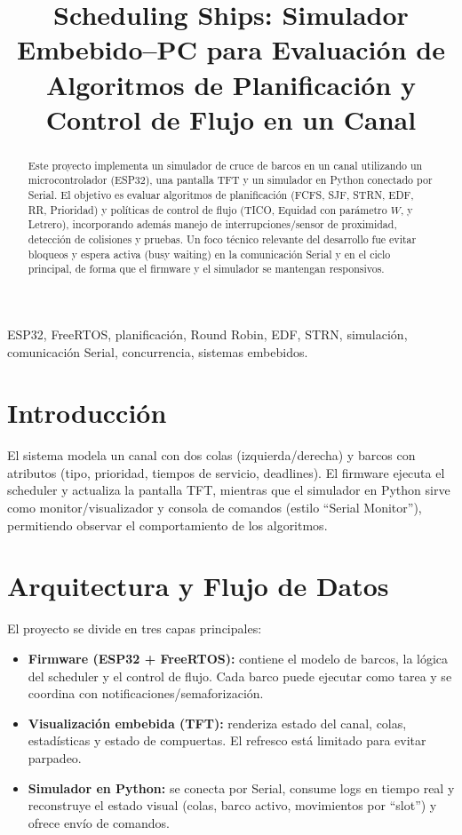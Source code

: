 \documentclass[journal]{IEEEtran}
\title{Scheduling Ships: Simulador Embebido--PC para Evaluación de Algoritmos de Planificación y Control de Flujo en un Canal}
\author{\IEEEauthorblockN{Randall Bolaños López \hspace{0.6em} Christopher Rodriguez Cordero \hspace{0.6em} Mauro Navarro}
}
\begin{document}
\maketitle

\begin{abstract}
Este proyecto implementa un simulador de cruce de barcos en un canal utilizando un microcontrolador (ESP32), una pantalla TFT y un simulador en Python conectado por Serial. El objetivo es evaluar algoritmos de planificación (FCFS, SJF, STRN, EDF, RR, Prioridad) y políticas de control de flujo (TICO, Equidad con parámetro $W$, y Letrero), incorporando además manejo de interrupciones/sensor de proximidad, detección de colisiones y pruebas. Un foco técnico relevante del desarrollo fue evitar bloqueos y espera activa (busy waiting) en la comunicación Serial y en el ciclo principal, de forma que el firmware y el simulador se mantengan responsivos.
\end{abstract}

\begin{IEEEkeywords}
ESP32, FreeRTOS, planificación, Round Robin, EDF, STRN, simulación, comunicación Serial, concurrencia, sistemas embebidos.
\end{IEEEkeywords}

\section{Introducción}
El sistema modela un canal con dos colas (izquierda/derecha) y barcos con atributos (tipo, prioridad, tiempos de servicio, deadlines). El firmware ejecuta el scheduler y actualiza la pantalla TFT, mientras que el simulador en Python sirve como monitor/visualizador y consola de comandos (estilo ``Serial Monitor''), permitiendo observar el comportamiento de los algoritmos.

\section{Arquitectura y Flujo de Datos}
El proyecto se divide en tres capas principales:
\begin{itemize}
	\item \textbf{Firmware (ESP32 + FreeRTOS):} contiene el modelo de barcos, la lógica del scheduler y el control de flujo. Cada barco puede ejecutar como tarea y se coordina con notificaciones/semaforización.
	\item \textbf{Visualización embebida (TFT):} renderiza estado del canal, colas, estadísticas y estado de compuertas. El refresco está limitado para evitar parpadeo.
	\item \textbf{Simulador en Python:} se conecta por Serial, consume logs en tiempo real y reconstruye el estado visual (colas, barco activo, movimientos por ``slot'') y ofrece envío de comandos.
\end{itemize}
\end{document}
